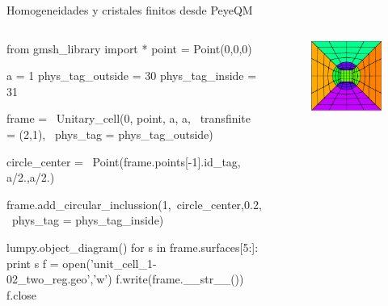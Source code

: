 \documentclass[xcolor=table,serif]{beamer}
\begin{document}
	\begin{frame}[fragile]{Homogeneidades y cristales finitos desde PeyeQM}
	\begin{columns}
		\tiny
			\begin{python}
	from gmsh_library import *
	point = Point(0,0,0)

a = 1
phys_tag_outside = 30
phys_tag_inside = 31

frame = \
Unitary_cell(0, point, a, a, \
transfinite = (2,1), \
phys_tag = phys_tag_outside)

circle_center = \
Point(frame.points[-1].id_tag, a/2.,a/2.)

frame.add_circular_inclussion(1,\
circle_center,0.2, \
phys_tag = phys_tag_inside)

lumpy.object_diagram()
for s in frame.surfaces[5:]:
    print s
f = open('unit_cell_1-02_two_reg.geo','w')
f.write(frame.__str__())
f.close
			\end{python}
			\begin{figure}
			\centering
			\includegraphics[scale=0.2]{unit_cell_pretty.eps}
			\end{figure}
		\end{columns}
	\end{frame}
\end{document}
